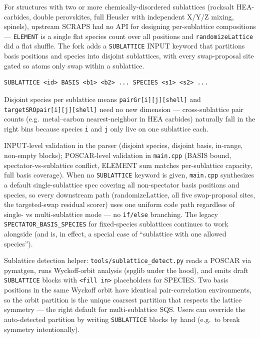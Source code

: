 \documentclass[
  11pt,
]{article}
\begin{document}
For structures with two or more chemically-disordered sublattices
(rocksalt HEA-carbides, double perovskites, full Heusler with
independent X/Y/Z mixing, spinels), upstream SCRAPS had no API for
designing per-sublattice compositions --- \texttt{ELEMENT} is a single
flat species count over all positions and \texttt{randomizeLattice} did
a flat shuffle. The fork adds a \texttt{SUBLATTICE} INPUT keyword that
partitions basis positions and species into disjoint sublattices, with
every swap-proposal site gated so atoms only swap within a sublattice.

\begin{verbatim}
SUBLATTICE <id> BASIS <b1> <b2> ... SPECIES <s1> <s2> ...
\end{verbatim}

Disjoint species per sublattice means
\texttt{pairGr{[}i{]}{[}j{]}{[}shell{]}} and
\texttt{targetSROpair{[}i{]}{[}j{]}{[}shell{]}} need no new dimension
--- cross-sublattice pair counts (e.g.~metal--carbon nearest-neighbor in
HEA carbides) naturally fall in the right bins because species
\texttt{i} and \texttt{j} only live on one sublattice each.

INPUT-level validation in the parser (disjoint species, disjoint basis,
in-range, non-empty blocks); POSCAR-level validation in
\texttt{main.cpp} (BASIS bound, spectator-vs-sublattice conflict,
ELEMENT sum matches per-sublattice capacity, full basis coverage). When
no \texttt{SUBLATTICE} keyword is given, \texttt{main.cpp} synthesizes a
default single-sublattice spec covering all non-spectator basis
positions and species, so every downstream path (randomizeLattice, all
five swap-proposal sites, the targeted-swap residual scorer) uses one
uniform code path regardless of single- vs multi-sublattice mode --- no
\texttt{if/else} branching. The legacy
\texttt{SPECTATOR\_BASIS\_SPECIES} for fixed-species sublattices
continues to work alongside (and is, in effect, a special case of
``sublattice with one allowed species'').

Sublattice detection helper: \texttt{tools/sublattice\_detect.py} reads
a POSCAR via pymatgen, runs Wyckoff-orbit analysis (spglib under the
hood), and emits draft \texttt{SUBLATTICE} blocks with
\texttt{\textless{}fill\ in\textgreater{}} placeholders for SPECIES. Two
basis positions in the same Wyckoff orbit have identical
pair-correlation environments, so the orbit partition is the unique
coarsest partition that respects the lattice symmetry --- the right
default for multi-sublattice SQS. Users can override the auto-detected
partition by writing \texttt{SUBLATTICE} blocks by hand (e.g.~to break
symmetry intentionally).
\end{document}
